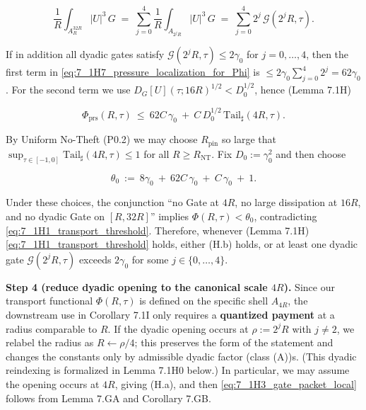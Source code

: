 \documentclass[
  11pt,
]{article}
\begin{document}
\begin{equation}
\frac1R\int_{A_{R}^{32R}}|U|^3\,G
\;=\;\sum_{j=0}^{4}\frac1R\int_{A_{2^jR}}|U|^3\,G
\;=\;\sum_{j=0}^{4}2^j\,\mathcal G(2^jR,\tau).
\tag{7.1H8}\label{eq:7_1H8_dyadic_gate_sum}
\end{equation}

If in addition all dyadic gates satisfy \(\mathcal G(2^jR,\tau)\le 2\gamma_0\) for \(j=0,\dots,4\), then the first term in \eqref{eq:7_1H7_pressure_localization_for_Phi} is \(\le 2\gamma_0\sum_{j=0}^4 2^j=62\gamma_0\). For the second term we use \(D_G[U](\tau;16R)^{1/2}<D_0^{1/2}\), hence (Lemma 7.1H)

\begin{equation}
\Phi_{\mathrm{prs}}(R,\tau)\ \le\ 62C\,\gamma_0\ +\ C\,D_0^{1/2}\,\mathrm{Tail}_\sharp(4R,\tau).
\tag{7.1H9}\label{eq:7_1H9_pressure_bound_under_no_gate_no_diss}
\end{equation}

By Uniform No-Theft (P0.2) we may choose \(R_{\mathrm{pin}}\) so large that \(\sup_{\tau\in[-1,0]}\mathrm{Tail}_\sharp(4R,\tau)\le 1\) for all \(R\ge R_{\mathrm{NT}}\). Fix \(D_0:=\gamma_0^2\) and then choose

\begin{equation}
\theta_0\ :=\ 8\gamma_0\ +\ 62C\,\gamma_0\ +\ C\,\gamma_0\ +\ 1.
\tag{7.1H10}\label{eq:7_1H10_theta0_choice}
\end{equation}

Under these choices, the conjunction ``no Gate at \(4R\), no large dissipation at \(16R\), and no dyadic Gate on \([R,32R]\)'' implies \(\Phi(R,\tau)<\theta_0\), contradicting \eqref{eq:7_1H1_transport_threshold}. Therefore, whenever (Lemma 7.1H) \eqref{eq:7_1H1_transport_threshold} holds, either (H.b) holds, or at least one dyadic gate \(\mathcal G(2^jR,\tau)\) exceeds \(2\gamma_0\) for some \(j\in\{0,\dots,4\}\).

\textbf{Step 4 (reduce dyadic opening to the canonical scale \(4R\)).} Since our transport functional \(\Phi(R,\tau)\) is defined on the specific shell \(A_{4R}\), the downstream use in Corollary 7.1I only requires a \textbf{quantized payment} at a radius comparable to \(R\). If the dyadic opening occurs at \(\rho:=2^jR\) with \(j\neq 2\), we relabel the radius as \(R\leftarrow \rho/4\); this preserves the form of the statement and changes the constants only by admissible dyadic factor (class (A))s. (This dyadic reindexing is formalized in Lemma 7.1H0 below.) In particular, we may assume the opening occurs at \(4R\), giving (H.a), and then \eqref{eq:7_1H3_gate_packet_local} follows from Lemma 7.GA and Corollary 7.GB.
\end{document}
